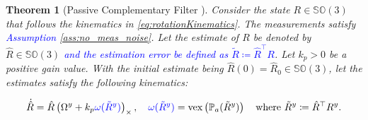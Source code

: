 \documentclass{article}
\newcommand{\SOthree}{\mathbb{SO}(3)}
\newcommand{\Omegay}{\Omega^y}
\newcommand{\vex}[1]{\text{vex}\left(#1\right)}
\newtheorem{theorem}{Theorem}
\newcommand{\textblue}[1]{\textcolor{blue}{#1}}
\newcommand{\Rtilde}{\tilde{R}}
\begin{document}
\begin{theorem}[Passive Complementary Filter \textblue{{\cite[Theorem 4.2]{mahony_complementaryFilter}}}] \label{thm:mahony}
Consider the state $R\in\SOthree$ that follows the kinematics in  \eqref{eq:rotationKinematics}. The measurements satisfy \textblue{Assumption \ref{ass:no_meas_noise}}. Let the estimate of ${R}$ be denoted by ${\hat{R}\in\SOthree}$ \textblue{and the estimation error be defined as $\Rtilde\coloneqq \hat{R}^\top R$}. {Let $k_p > 0$ be a positive gain value. With the initial estimate being $\hat{R}(0) = \hat{R}_0 \in \SOthree$}, let the estimates satisfy the following {kinematics:}



\begin{align}\label{eq:observer}
    \dot{\hat{R}} = \hat{R}\left( \Omegay + k_p\textblue{\omega(\Rtilde^y)}\right)_\times, \quad \textblue{\omega(\Rtilde^y)} = \vex{\mathbb{P}_a({\Rtilde^y})} \quad \text{where } {\Rtilde^y \coloneqq \hat{R}^\top R^y}.
\end{align}



\end{theorem}
\end{document}

